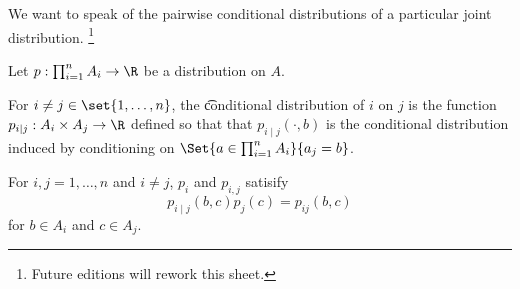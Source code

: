 
We want to speak of the pairwise conditional distributions of a particular joint distribution.
  \ifhmode\unskip\fi\footnote{
Future editions will rework this sheet.
  }

Let $p: \prod_{i = 1}^{n} A_i \to \R $ be a distribution on $A$.

For $i \neq j \in \set{1, \dots, n}$, the \t{conditional distribution} of $i$ on $j$ is the function $p_{i \mid j}: A_i \times A_j \to \R $ defined so that that $p_{i \mid j}(\cdot, b)$ is the conditional distribution induced by conditioning on $\Set{a \in \prod_{i = 1}^{n} A_i }{a_j = b}$.

For $i,j = 1, \dots, n$ and $i \neq j$, $p_i$ and $p_{i,j}$ satisify
  \[
p_{i \mid j}(b, c)p_{j}(c) = p_{ij}(b, c)
  \]
for $b \in A_i$ and $c \in A_j$.

\blankpage
